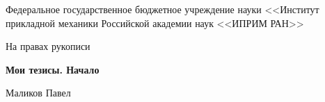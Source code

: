 \thispagestyle{empty}
\begin{center}
Федеральное государственное бюджетное учреждение науки <<Институт прикладной механики Российской академии наук <<ИПРИМ РАН>>
\end{center}
%
\vspace{0pt plus1fill} %
\begin{flushright}
	На правах рукописи
	
\end{flushright}
\vspace{0pt plus1fill} %





\begin{center}
\textbf {\large Мои тезисы. Начало}
\end{center}
\vspace{0pt plus0fill} %
\begin{center}
{\large Маликов Павел}
\end{center}
\vspace{36pt plus1fill} %